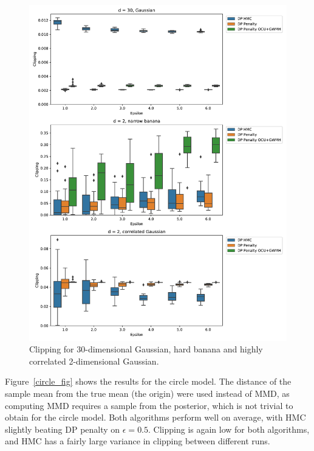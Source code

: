 \documentclass[english,twoside,openright]{HYgraduMLDS}
\begin{document}
\begin{figure}
  \centering
  \includegraphics[width=\textwidth]{figures/banana_extra_clipping}
  \caption{
    Clipping for 30-dimensional Gaussian, hard banana and highly correlated
    2-dimensional Gaussian.
  }
  \label{banana_extra_clipping_fig}
\end{figure}

Figure~\ref{circle_fig} shows the results for the circle model. The distance
of the sample mean from the true mean (the origin) were used instead of MMD,
as computing MMD requires a sample from the posterior, which is not trivial
to obtain for the circle model. Both algorithms perform well on average, with
HMC slightly beating DP penalty on \(\epsilon = 0.5\). Clipping is again low
for both algorithms, and HMC has a fairly large variance in clipping between
different runs.
\end{document}
